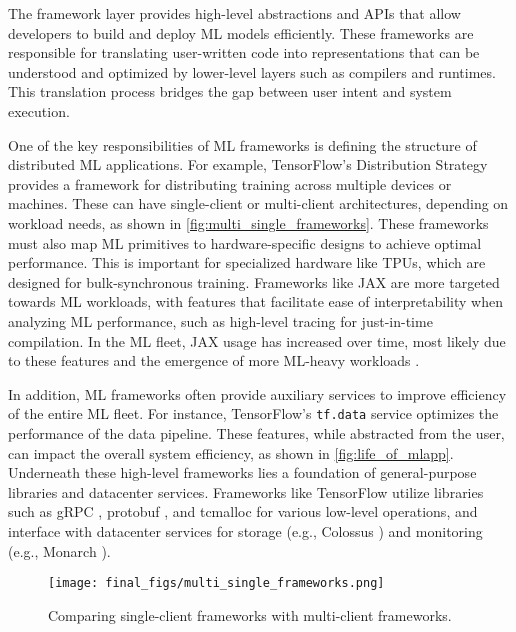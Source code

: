 The framework layer provides high-level abstractions and APIs that allow developers to build and deploy ML models efficiently. These frameworks are responsible for translating user-written code into representations that can be understood and optimized by lower-level layers such as compilers and runtimes. This translation process bridges the gap between user intent and system execution.



One of the key responsibilities of ML frameworks is defining the structure of distributed ML applications. For example, TensorFlow's Distribution Strategy \cite{abadi2016tensorflowlargescalemachinelearning} provides a framework for distributing training across multiple devices or machines. These can have single-client or multi-client architectures, depending on workload needs, as shown in \autoref{fig:multi_single_frameworks}. These frameworks must also map ML primitives to hardware-specific designs to achieve optimal performance. This is important for specialized hardware like TPUs, which are designed for bulk-synchronous training. Frameworks like JAX are more targeted towards ML workloads, with features that facilitate ease of interpretability when analyzing ML performance, such as high-level tracing for just-in-time compilation. In the ML fleet, JAX usage has increased over time, most likely due to these features and the emergence of more ML-heavy workloads \cite{frostig2018compiling}.


In addition, ML frameworks often provide auxiliary services to improve efficiency of the entire ML fleet. For instance, TensorFlow's \texttt{tf.data} \cite{murray2021tfdata} service optimizes the performance of the data pipeline. These features, while abstracted from the user, can impact the overall system efficiency, as shown in \autoref{fig:life_of_mlapp}. Underneath these high-level frameworks lies a foundation of general-purpose libraries and datacenter services. Frameworks like TensorFlow utilize libraries such as gRPC \cite{grpc}, protobuf \cite{protobuf}, and tcmalloc \cite{tcmalloc} for various low-level operations, and interface with datacenter services for storage (e.g., Colossus \cite{ghemawat2003gfs} \cite{colossus}) and monitoring (e.g., Monarch \cite{adams2020monarch}). 


\begin{figure}[t!]
    \centering
    \texttt{[image: final\_figs/multi\_single\_frameworks.png]}
    \caption{
Comparing single-client frameworks with multi-client frameworks. 
    }
    \label{fig:multi_single_frameworks}
\end{figure}







